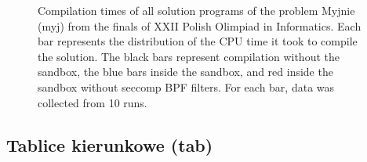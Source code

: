 \documentclass[en]{pracamgr}
\begin{document}
\begin{appendices}
\begin{figure}[H]
\caption{Compilation times of all solution programs of the problem Myjnie (myj) from the finals of XXII Polish Olimpiad in Informatics. Each bar represents the distribution of the CPU time it took to compile the solution. The black bars represent compilation without the sandbox, the blue bars inside the sandbox, and red inside the sandbox without seccomp BPF filters. For each bar, data was collected from 10 runs.}
\label{figure:myj_compilation_cpu_time}
\end{figure}

\subsection{Tablice kierunkowe (tab)}


\end{appendices}
\end{document}
